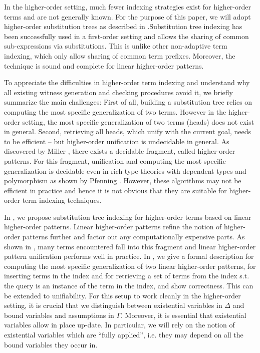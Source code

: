 \documentclass{acmconf}
\begin{document}
In the higher-order setting, much fewer indexing strategies exist for
higher-order terms and are not generally known. For the purpose of
this paper, we will adopt higher-order substitution trees as described
in \cite{Pientka:ICLP03}.Substitution tree indexing has been
successfully used in a first-order setting \cite{graf:substtrees} and
allows the sharing of common sub-expressions via substitutions. This
is unlike other non-adaptive term indexing, which only allow sharing
of common term prefixes. Moreover, the technique is sound and complete
for linear higher-order patterns.

To appreciate the difficulties in higher-order term indexing and
understand why all existing witness generation and checking procedures
avoid it, we briefly summarize the main challenges:
 First of all, building a substitution tree relies on computing the
 most specific generalization of two terms. However in the
 higher-order setting, the most specific generalization of two terms (heads)
 does not exist in general. Second, retrieving all heads, which unify
 with the current goal, needs to be efficient --
but higher-order unification is undecidable in general.  As discovered
by Miller \cite{Miller91iclp}, there exists a decidable fragment,
called higher-order patterns. For this fragment, unification and
computing the most specific generalization is decidable even in 
rich type theories with dependent types and polymorphism as shown by
Pfenning \cite{Pfenning91lics}.  However, these algorithms may not be
efficient in practice  \cite{PientkaPfenning:CADE03} and hence it is
not obvious that they are suitable for higher-order term
indexing techniques. 

In \cite{Pientka:ICLP02}, we propose substitution tree indexing for
higher-order terms based on linear higher-order patterns. Linear
higher-order patterns refine the notion of higher-order patterns
further and factor out any computationally expensive parts. As shown
in \cite{PientkaPfenning:CADE03}, many terms encountered fall into
this fragment and linear higher-order pattern unification performs well in
practice. In \cite{Pientka:ICLP02,Pientka:Phd}, we give a formal
description for computing the most specific generalization of two
linear higher-order patterns, for inserting terms in the index and for
retrieving a set of terms from the index s.t. the query is an instance
of the term in the index, and show correctness. This can be extended
to unifiability. For this setup to work cleanly in the higher-order
setting, it is crucial that we distinguish between existential
variables in $\Delta$ and bound variables and assumptions in
$\Gamma$. Moreover, it is essential that existential variables allow
in place up-date. In particular, we will rely on the notion of
existential variables which are ``fully applied'', i.e. they may
depend on all the bound variables they occur in.
\end{document}
